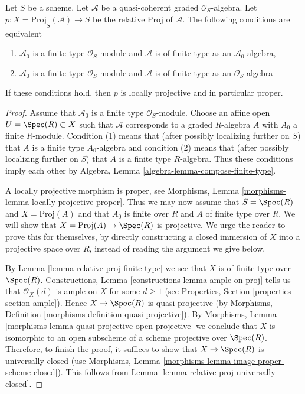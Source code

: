\begin{lemma}
\label{lemma-relative-proj-proper}
Let $S$ be a scheme. Let $\mathcal{A}$ be a quasi-coherent graded
$\mathcal{O}_S$-algebra. Let
$p : X = \underline{\text{Proj}}_S(\mathcal{A}) \to S$ be the relative
Proj of $\mathcal{A}$. The following conditions are equivalent
\begin{enumerate}
\item $\mathcal{A}_0$ is a finite type $\mathcal{O}_S$-module
and $\mathcal{A}$ is of finite type as an $\mathcal{A}_0$-algebra,
\item $\mathcal{A}_0$ is a finite type $\mathcal{O}_S$-module 
and $\mathcal{A}$ is of finite type as an $\mathcal{O}_S$-algebra
\end{enumerate}
If these conditions hold, then $p$ is locally projective and in
particular proper.
\end{lemma}

\begin{proof}
Assume that $\mathcal{A}_0$ is a finite type $\mathcal{O}_S$-module.
Choose an affine open $U = \Spec(R) \subset X$ such that $\mathcal{A}$
corresponds to a graded $R$-algebra $A$ with $A_0$ a finite $R$-module.
Condition (1) means that (after possibly localizing further on $S$)
that $A$ is a finite type $A_0$-algebra and condition (2) means that
(after possibly localizing further on $S$) that $A$ is a finite type
$R$-algebra. Thus these conditions imply each other by
Algebra, Lemma \ref{algebra-lemma-compose-finite-type}.

\medskip\noindent
A locally projective morphism is proper, see
Morphisms, Lemma \ref{morphisms-lemma-locally-projective-proper}.
Thus we may now assume that $S = \Spec(R)$ and $X = \text{Proj}(A)$
and that $A_0$ is finite over $R$ and $A$ of finite type over $R$.
We will show that $X = \text{Proj}(A) \to \Spec(R)$ is projective.
We urge the reader to prove this for themselves, by directly constructing
a closed immersion of $X$ into a projective space over $R$, instead
of reading the argument we give below.

\medskip\noindent
By Lemma \ref{lemma-relative-proj-finite-type}
we see that $X$ is of finite type over $\Spec(R)$.
Constructions, Lemma \ref{constructions-lemma-ample-on-proj}
tells us that $\mathcal{O}_X(d)$ is ample on $X$ for some $d \geq 1$
(see Properties, Section \ref{properties-section-ample}).
Hence $X \to \Spec(R)$ is quasi-projective (by
Morphisms, Definition \ref{morphisms-definition-quasi-projective}).
By Morphisms, Lemma \ref{morphisms-lemma-quasi-projective-open-projective}
we conclude that $X$ is isomorphic to an open subscheme of a scheme
projective over $\Spec(R)$. Therefore, to finish the proof, it suffices
to show that $X \to \Spec(R)$ is universally closed (use
Morphisms, Lemma \ref{morphisms-lemma-image-proper-scheme-closed}).
This follows from Lemma \ref{lemma-relative-proj-universally-closed}.
\end{proof}











